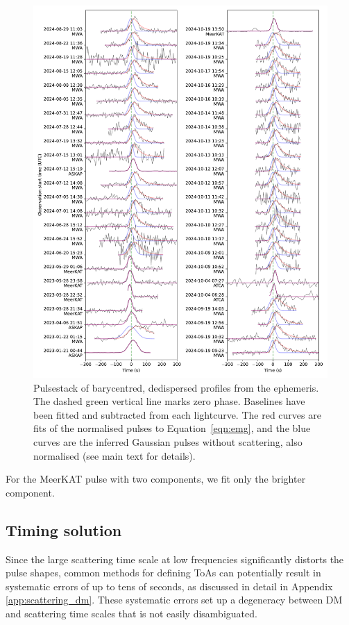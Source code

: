 \documentclass[fleqn,usenatbib]{mnras}
\newcommand{\Eqn}{Equation}
\begin{document}
\begin{figure}
      \centering
          \includegraphics[width=0.95\linewidth]{pulsestack.pdf}
              \caption{Pulsestack of barycentred, dedispersed profiles from the ephemeris. The dashed green vertical line marks zero phase. Baselines have been fitted and subtracted from each lightcurve. The red curves are fits of the normalised pulses to \Eqn~\ref{eqn:emg}, and the blue curves are the inferred Gaussian pulses without scattering, also normalised (see main text for details).}
                  \label{fig:pulsestack}
\end{figure}

For the MeerKAT pulse with two components, we fit only the brighter component.

\subsection{Timing solution} \label{sec:timing}

Since the large scattering time scale at low frequencies significantly distorts the pulse shapes, common methods for defining ToAs can potentially result in systematic errors of up to tens of seconds, as discussed in detail in Appendix \ref{app:scattering_dm}.
These systematic errors set up a degeneracy between DM and scattering time scales that is not easily disambiguated.
\end{document}
